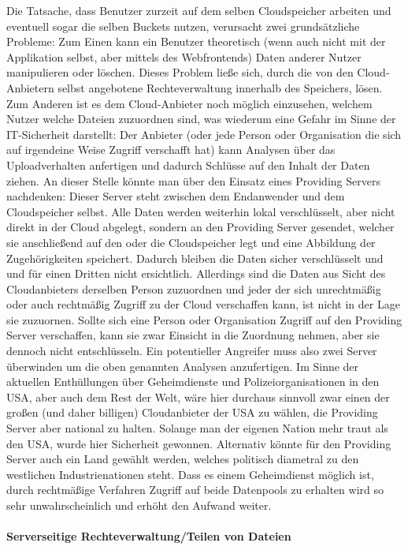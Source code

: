 \documentclass[13pt,a4paper,bibliography=totocnumbered,listof=totocnumbered]{scrartcl}
\begin{document}
Die Tatsache, dass Benutzer zurzeit auf dem selben Cloudspeicher arbeiten und eventuell sogar die selben Buckets nutzen, verursacht zwei grundsätzliche Probleme: Zum Einen kann ein Benutzer theoretisch (wenn auch nicht mit der Applikation selbst, aber mittels des Webfrontends) Daten anderer Nutzer manipulieren oder löschen. Dieses Problem ließe sich, durch die von den Cloud-Anbietern selbst angebotene Rechteverwaltung innerhalb des Speichers, lösen. Zum Anderen ist es dem Cloud-Anbieter noch möglich einzusehen, welchem Nutzer welche Dateien zuzuordnen sind, was wiederum eine Gefahr im Sinne der IT-Sicherheit darstellt: Der Anbieter (oder jede Person oder Organisation die sich auf irgendeine Weise Zugriff verschafft hat) kann Analysen über das Uploadverhalten anfertigen und dadurch Schlüsse auf den Inhalt der Daten ziehen. An dieser Stelle könnte man über den Einsatz eines Providing Servers nachdenken: Dieser Server steht zwischen dem Endanwender und dem Cloudspeicher selbst. Alle Daten werden weiterhin lokal verschlüsselt, aber nicht direkt in der Cloud abgelegt, sondern an den Providing Server gesendet, welcher sie anschließend auf den oder die Cloudspeicher legt und eine Abbildung der Zugehörigkeiten speichert. Dadurch bleiben die Daten sicher verschlüsselt und und für einen Dritten nicht ersichtlich. Allerdings sind die Daten aus Sicht des Cloudanbieters derselben Person zuzuordnen und jeder der sich unrechtmäßig oder auch rechtmäßig Zugriff zu der Cloud verschaffen kann, ist nicht in der Lage sie zuzuornen. Sollte sich eine Person oder Organisation Zugriff auf den Providing Server verschaffen, kann sie zwar Einsicht in die Zuordnung nehmen, aber sie dennoch nicht entschlüsseln. Ein potentieller Angreifer muss also zwei Server überwinden um die oben genannten Analysen anzufertigen. Im Sinne der aktuellen Enthüllungen über Geheimdienste und Polizeiorganisationen in den USA, aber auch dem Rest der Welt, wäre hier durchaus sinnvoll zwar einen der großen (und daher billigen) Cloudanbieter der USA zu wählen, die Providing Server aber national zu halten. Solange man der eigenen Nation mehr traut als den USA, wurde hier Sicherheit gewonnen. Alternativ könnte für den Providing Server auch ein Land gewählt werden, welches politisch diametral zu den westlichen Industrienationen steht. Dass es einem Geheimdienst möglich ist, durch rechtmäßige Verfahren Zugriff auf beide Datenpools zu erhalten wird so sehr unwahrscheinlich und erhöht den Aufwand weiter.\\
\\\textbf{Serverseitige Rechteverwaltung/Teilen von Dateien}\\
\end{document}
